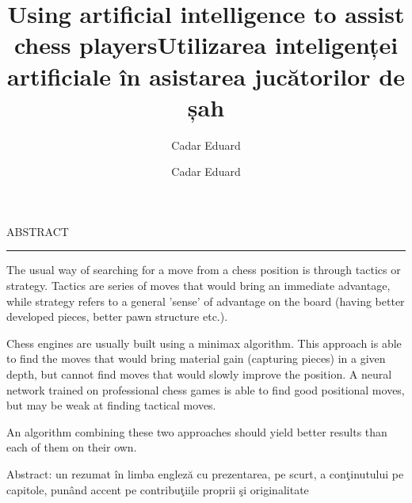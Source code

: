 \documentclass[12pt]{report}
\begin{document}
\title{Using artificial intelligence to assist chess players}
\author{Cadar Eduard}
\maketitle

\title{Utilizarea inteligenței artificiale în asistarea jucătorilor de șah}
\author{Cadar Eduard}
\maketitle

\newpage
\thispagestyle{empty}
\mbox{}
\newpage
{} 

\cleardoublepage
ABSTRACT
\vspace{0.5cm}	
\hrule
\vspace{0.5cm}	

The usual way of searching for a move from a chess position is through tactics or strategy. Tactics are series of moves that would bring an immediate advantage, while strategy refers to a general 'sense' of advantage on the board (having better developed pieces, better pawn structure etc.).

Chess engines are usually built using a minimax algorithm. This approach is able to find the moves that would bring material gain (capturing pieces) in a given depth, but cannot find moves that would slowly improve the position. A neural network trained on professional chess games is able to find good positional moves, but may be weak at finding tactical moves.

An algorithm combining these two approaches should yield better results than each of them on their own.

Abstract: un rezumat \^{i}n limba englez\u{a} cu prezentarea, pe scurt, a con\c{t}inutului pe capitole, pun\^{a}nd accent pe contribu\c{t}iile proprii \c{s}i originalitate

\tableofcontents

\newpage
{}











\end{document}

